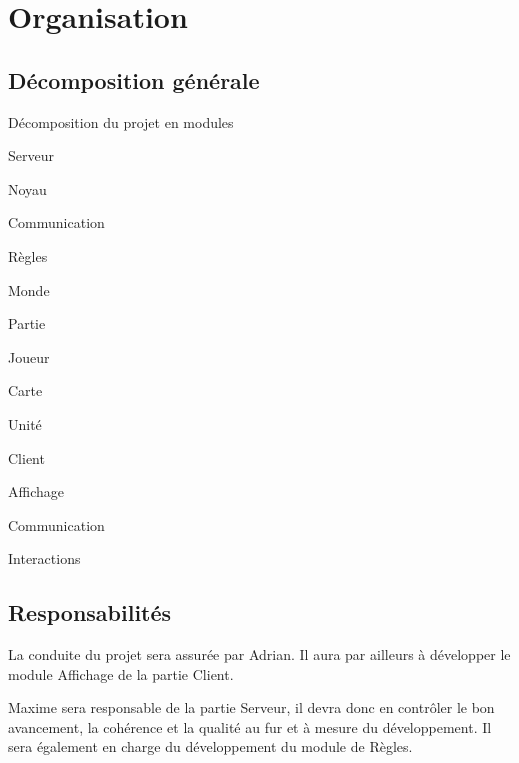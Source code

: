 \documentclass[a4paper,10pt]{report}
\begin{document}
  \chapter{Organisation}

    \section{Décomposition générale}

      Décomposition du projet en modules
      
      \begin{list}{-}{}
        \item{Serveur}
        \begin{list}{-}{}
          \item{Noyau}
          \begin{list}{-}{}
            \item{Communication}
            \item{Règles}
          \end{list}
          \item{Monde}
          \begin{list}{-}{}
            \item{Partie}
            \item{Joueur}
            \item{Carte}
            \item{Unité}
          \end{list}
        \end{list}
        
        \item{Client}
        \begin{list}{-}{}
          \item{Affichage}
          \item{Communication}
          \item{Interactions}
        \end{list}
      \end{list}


    \section{Responsabilités}
    
      La conduite du projet sera assurée par Adrian. Il aura par ailleurs à développer le module Affichage de la partie Client. 
      
      Maxime sera responsable de la partie Serveur, il devra donc en contrôler le bon avancement, la cohérence et la qualité au fur et à mesure du développement. Il sera également en charge du développement du module de Règles. 
      
\end{document}
